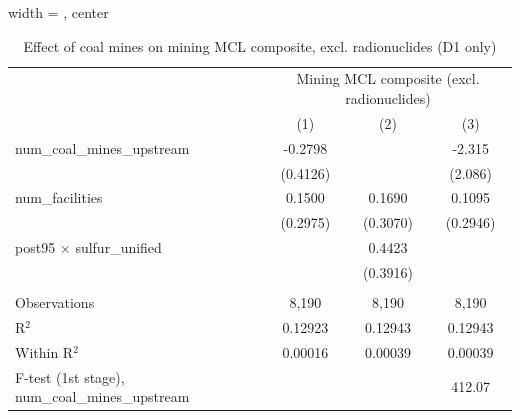 
\begin{table}[htbp]
   
   \caption{\label{2sls_4step_d1_mining_mcl_norad} Effect of coal mines on mining MCL composite, excl. radionuclides (D1 only)}
   \bigskip
   
   \centering
   
   \begin{adjustbox}{width = \textwidth, center}
      
      
      \begin{tabular}{lccc}
         \toprule
         
          & \multicolumn{3}{c}{Mining MCL composite (excl. radionuclides)}\\
         
                                                           & (1)           & (2)           & (3)\\  
         
         \midrule 
         num\_coal\_mines\_upstream                        & -0.2798       &               & -2.315\\   
                                                           & (0.4126)      &               & (2.086)\\   
         num\_facilities                                   & 0.1500        & 0.1690        & 0.1095\\   
                                                           & (0.2975)      & (0.3070)      & (0.2946)\\   
         post95 $\times$ sulfur\_unified                   &               & 0.4423        &   \\   
                                                           &               & (0.3916)      &   \\   
         
          \\
         
         Observations                                      & 8,190         & 8,190         & 8,190\\  
         R$^2$                                             & 0.12923       & 0.12943       & 0.12943\\  
         Within R$^2$                                      & 0.00016       & 0.00039       & 0.00039\\  
         F-test (1st stage), num\_coal\_mines\_upstream    &               &               & 412.07\\  
         

\end{tabular}
\end{adjustbox}
\end{table}
